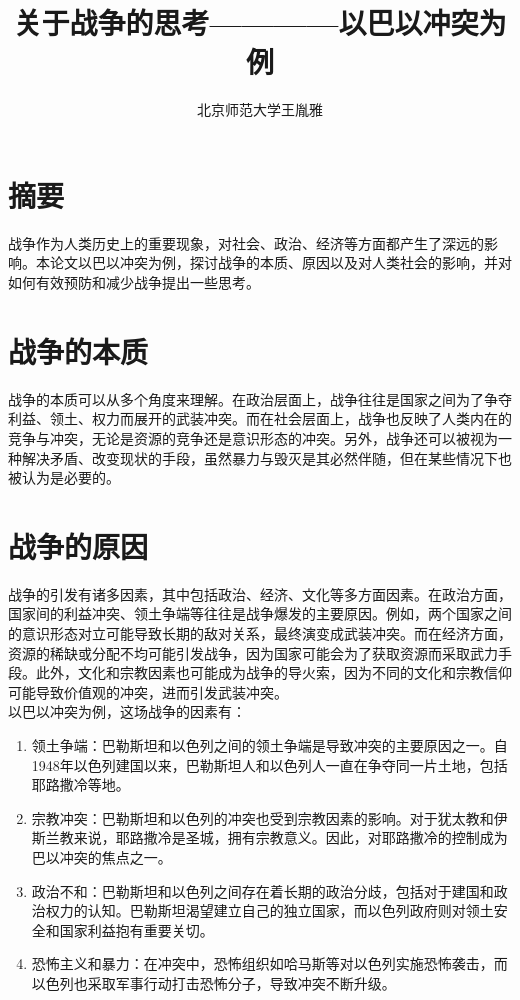 \documentclass{ctexart}
\title{关于战争的思考————以巴以冲突为例}
\author{北京师范大学\quad 王胤雅\quad 201911010205}
\begin{document}
\large
{} %
\maketitle
\section{摘要}
战争作为人类历史上的重要现象，对社会、政治、经济等方面都产生了深远的影响。本论文以巴以冲突为例，探讨战争的本质、原因以及对人类社会的影响，并对如何有效预防和减少战争提出一些思考。

\section{战争的本质}
战争的本质可以从多个角度来理解。在政治层面上，战争往往是国家之间为了争夺利益、领土、权力而展开的武装冲突。而在社会层面上，战争也反映了人类内在的竞争与冲突，无论是资源的竞争还是意识形态的冲突。另外，战争还可以被视为一种解决矛盾、改变现状的手段，虽然暴力与毁灭是其必然伴随，但在某些情况下也被认为是必要的。
\section{战争的原因}
战争的引发有诸多因素，其中包括政治、经济、文化等多方面因素。在政治方面，国家间的利益冲突、领土争端等往往是战争爆发的主要原因。例如，两个国家之间的意识形态对立可能导致长期的敌对关系，最终演变成武装冲突。而在经济方面，资源的稀缺或分配不均可能引发战争，因为国家可能会为了获取资源而采取武力手段。此外，文化和宗教因素也可能成为战争的导火索，因为不同的文化和宗教信仰可能导致价值观的冲突，进而引发武装冲突。\\
以巴以冲突为例，这场战争的因素有：
\begin{enumerate}
  \item 领土争端：巴勒斯坦和以色列之间的领土争端是导致冲突的主要原因之一。自1948年以色列建国以来，巴勒斯坦人和以色列人一直在争夺同一片土地，包括耶路撒冷等地。

  \item 宗教冲突：巴勒斯坦和以色列的冲突也受到宗教因素的影响。对于犹太教和伊斯兰教来说，耶路撒冷是圣城，拥有宗教意义。因此，对耶路撒冷的控制成为巴以冲突的焦点之一。

  \item 政治不和：巴勒斯坦和以色列之间存在着长期的政治分歧，包括对于建国和政治权力的认知。巴勒斯坦渴望建立自己的独立国家，而以色列政府则对领土安全和国家利益抱有重要关切。

  \item 恐怖主义和暴力：在冲突中，恐怖组织如哈马斯等对以色列实施恐怖袭击，而以色列也采取军事行动打击恐怖分子，导致冲突不断升级。
\end{enumerate}
\end{document}
